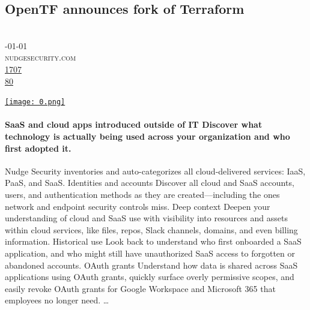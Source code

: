 \documentclass[10pt,a4paper]{article}
\begin{document}
\subsection{OpenTF announces fork of Terraform}
\noindent\begin{minipage}[t]{0.19\linewidth}
\vspace{0pt}
\noindent\scshape\footnotesize
\\ {\scriptsize\faCalendar}-01-01
\\ {\scriptsize\faGlobe}\space 
nudgesecurity.com
\\ {\scriptsize\faThumbsOUp}\space 
\href{http://news.ycombinator.com/item?id=37262440\&utm\_term=comment}{1707} 
\\ {\scriptsize\faComments}\space 
\href{http://news.ycombinator.com/item?id=37262440\&utm\_term=comment}{80} 
\end{minipage} 
\begin{minipage}[t]{0.80\linewidth}
\vspace{0pt}
\begin{multicols}{2}
    \href{https://opentf.org/announcement?utm\_source=hackernewsletter\&utm\_medium=email\&utm\_term=fav}{
        \texttt{[image: 0.png]}
    }
\paragraph{SaaS and cloud apps introduced outside of IT
Discover what technology is actually being used across your organization and who first adopted it.}
 Nudge Security inventories and auto-categorizes all cloud-delivered services: IaaS, PaaS, and SaaS.
Identities and accounts
Discover all cloud and SaaS accounts, users, and authentication methods as they are created—including the ones network and endpoint security controls miss.
Deep context
Deepen your understanding of cloud and SaaS use with visibility into resources and assets within cloud services, like files, repos, Slack channels, domains, and even billing information.
Historical use
Look back to understand who first onboarded a SaaS application, and who might still have unauthorized SaaS access to forgotten or abandoned accounts.
OAuth grants
Understand how data is shared across SaaS applications using OAuth grants, quickly surface overly permissive scopes, and easily revoke OAuth grants for Google Workspace and Microsoft 365 that employees no longer need.
\dots
\end{multicols}
\end{minipage}
\par\medskip
\end{document}
